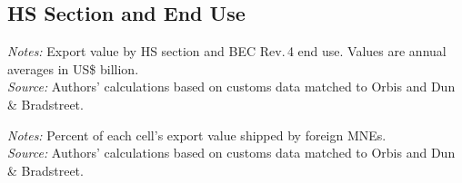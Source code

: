 \documentclass[11pt,a4paper]{article}
\begin{document}
\subsection{HS Section and End Use}
\begin{table}[H]\centering\small%
  \caption{Other Goods: Exports by HS Section and End Use}%
  \label{tab:sxe_v_rest}%
  \par\vspace{3pt}%
  \begin{minipage}{0.95\textwidth}\footnotesize %
  \textit{Notes:} Export value by HS section and BEC Rev.\,4 end use. Values are annual averages in US\$ billion.\\[3pt]%
  \textit{Source:} Authors' calculations based on customs data matched to Orbis and Dun \& Bradstreet.%
  \end{minipage}%
  \end{table}
\begin{table}[H]\centering\small%
  \caption{Other Goods: Foreign-Multinational Share of Exports by HS Section and End Use}%
  \label{tab:sxe_f_rest}%
  \par\vspace{3pt}%
  \begin{minipage}{0.95\textwidth}\footnotesize %
  \textit{Notes:} Percent of each cell's export value shipped by foreign MNEs.\\[3pt]%
  \textit{Source:} Authors' calculations based on customs data matched to Orbis and Dun \& Bradstreet.%
  \end{minipage}%
  \end{table}
\end{document}
